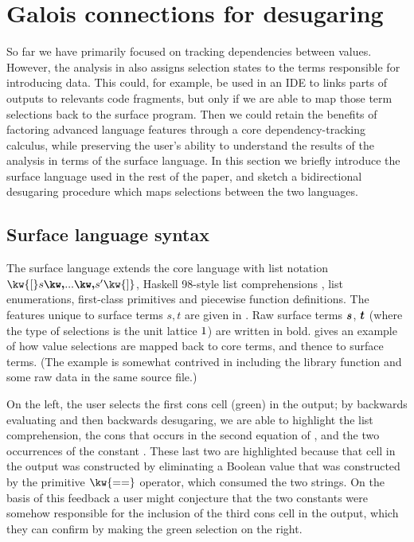 \newpage
\section{Galois connections for desugaring}
\label{sec:surface-language}

 So far we have primarily focused on tracking dependencies between values. However, the analysis in  also assigns selection states to the terms responsible for introducing data. This could, for example, be used in an IDE to links parts of outputs to relevants code fragments, but only if we are able to map those term selections back to the surface program. Then we could retain the benefits of factoring advanced language features through a core dependency-tracking calculus, while preserving the user's ability to understand the results of the analysis in terms of the surface language. In this section we briefly introduce the surface language \OurLanguage{} used in the rest of the paper, and sketch a bidirectional desugaring procedure which maps selections between the two languages.




\subsection{Surface language syntax}

The surface language \OurLanguage{} extends the core language with list notation $\kw{[} s \comma \ldots \comma s' \kw{]}$, Haskell 98-style list comprehensions \cite{peytonJones03}, list enumerations, first-class primitives and piecewise function definitions. The features unique to surface terms $s, t$ are given in . Raw surface terms $\bm{s}$, $\bm{t}$ (where the type of selections is the unit lattice $1$) are written in bold.  gives an example of how value selections are mapped back to core terms, and thence to surface terms. (The example is somewhat contrived in including the library function  and some raw data in the same source file.)

On the left, the user selects the first cons cell (green) in the output; by backwards evaluating and then backwards desugaring, we are able to highlight the list comprehension, the cons that occurs in the second equation of , and the two occurrences of the constant . These last two are highlighted because that cell in the output was constructed by eliminating a Boolean value that was constructed by the primitive $\kw{==}$ operator, which consumed the two strings. On the basis of this feedback a  user might conjecture that the two constants  were somehow responsible for the inclusion of the third cons cell in the output, which they can confirm by making the green selection on the right.

